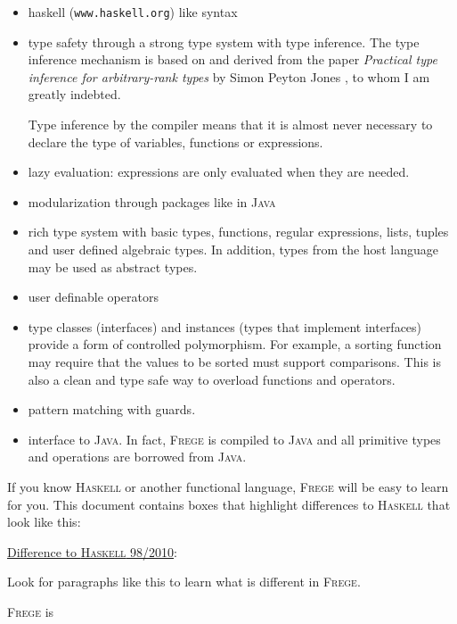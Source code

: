\documentclass[lletterpaper,12pt]{report}
\newcommand{\boxquote}[3]{
\begin{center}
\colorbox{#1}%
{\parbox{0.9\textwidth}{
\sf
\underline{#2}:
#3
}}
\end{center}}
\newcommand{\hasdiff}[1]{\boxquote{rot}{Difference to \haskell{} 98/2010}{#1}}
\newcommand{\haskell}[0]{\textsc{Haskell}}
\newcommand{\frege}[0]{\textsc{Frege}}
\newcommand{\java}[0]{\textsc{Java}}
\begin{document}
\begin{itemize}

\item haskell{} ({\tt www.haskell.org}) like syntax

\item type safety through a strong type system with type inference. The
type inference mechanism is based on and derived from the paper
\emph{Practical type inference for arbitrary-rank types} by Simon
Peyton Jones \cite{ptifart}, to whom I am greatly indebted.

Type inference by the compiler means that it is
almost never necessary to declare the type of variables, functions or
expressions.

\item lazy evaluation: expressions are only evaluated when they are
needed.

\item modularization through packages like in \java{}

\item rich type system with basic types, functions, regular expressions,
lists, tuples and user defined algebraic types.
In addition, types from the host language may be used as abstract
types.

\item user definable operators

\item type classes (interfaces) and instances (types that
implement interfaces) provide a form of controlled polymorphism. For
example, a sorting function may require that the values to be sorted
must support comparisons. This is also a clean and type safe way to
overload functions and operators.

\item pattern matching with guards.

\item interface to \java{}. In fact, \frege{} is
compiled to \java{} and
all primitive types and operations are borrowed from \java{}.

\end{itemize}

If you know \haskell{} or another functional language,
\frege{} will be easy to learn for you. This document contains boxes
that highlight differences to \haskell{} that look like this:

\hasdiff{
Look for paragraphs like this to learn what is different in \frege{}.
}

\frege{} is
\end{document}
